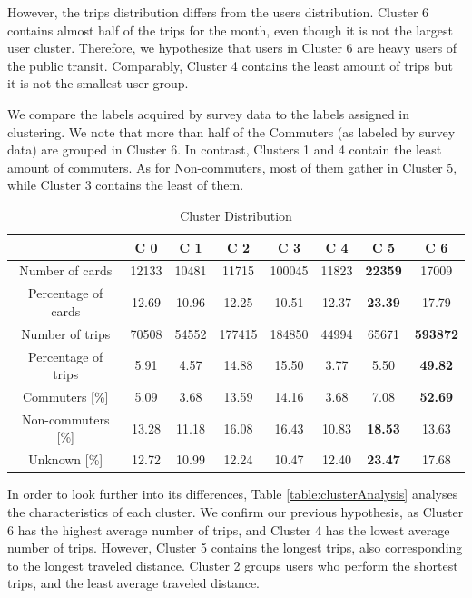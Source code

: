 \documentclass{article}
\begin{document}
However, the trips distribution differs from the users distribution. Cluster 6 contains almost half of the trips for the month, even though it is not the largest user cluster. Therefore, we hypothesize that users in Cluster 6 are heavy users of the public transit. Comparably, Cluster 4 contains the least amount of trips but it is not the smallest user group. 

We compare the labels acquired by survey data to the labels assigned in clustering. We note that more than half of the Commuters (as labeled by survey data) are grouped in Cluster 6. In contrast, Clusters 1 and 4 contain the least amount of commuters. As for Non-commuters, most of them gather in Cluster 5, while Cluster 3 contains the least of them.

\begin{table}[H]
\centering
\begin{tabular}{||c|c|c|c|c|c|c|c||}
\hline
 & \textbf{C 0} & \textbf{C 1} & \textbf{C 2} & \textbf{C 3} & \textbf{C 4}  & \textbf{C 5} & \textbf{C 6} \\
[0.5ex] 
\hline \hline
Number of cards & 12133 & 10481 & 11715 & 100045 & 11823 & \textbf{22359} & 17009 \\
Percentage of cards & 12.69 & 10.96 & 12.25 & 10.51 & 12.37 & \textbf{23.39} & 17.79 \\
\hline
Number of trips & 70508 & 54552 & 177415 & 184850 & 44994 & 65671 & \textbf{593872} \\
Percentage of trips & 5.91 & 4.57 & 14.88 & 15.50 & 3.77 & 5.50 & \textbf{49.82} \\
\hline
Commuters [\%] & 5.09 & 3.68 & 13.59 & 14.16 & 3.68 & 7.08 & \textbf{52.69} \\ 
Non-commuters [\%] & 13.28 & 11.18 & 16.08 & 16.43 & 10.83 & \textbf{18.53} & 13.63 \\ 
Unknown [\%] & 12.72 & 10.99 & 12.24 & 10.47 & 12.40 & \textbf{23.47} & 17.68 \\  [1ex]
\hline 
\end{tabular}
\caption{Cluster Distribution} %
\label{table:clusterDistribution}
\end{table}

In order to look further into its differences, Table \ref{table:clusterAnalysis} analyses the characteristics of each cluster. We confirm our previous hypothesis, as Cluster 6 has the highest average number of trips, and Cluster 4 has the lowest average number of trips. However, Cluster 5 contains the longest trips, also corresponding to the longest traveled distance. Cluster 2 groups users who perform the shortest trips, and the least average traveled distance. 
\end{document}
